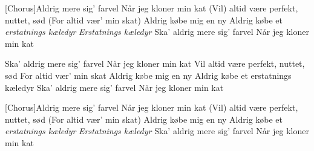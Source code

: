 \documentclass[a4paper,12pt]{article}
\begin{document}
\begin{song}

[Chorus]Aldrig mere sig' farvel
Når jeg kloner min kat
(Vil) altid være perfekt, nuttet, sød
(For altid vær' min skat)
Aldrig købe mig en ny
Aldrig købe et \emph{erstatnings kæledyr}
\emph{Erstatnings kæledyr}
Ska' aldrig mere sig' farvel
Når jeg kloner min kat

Ska' aldrig mere sig' farvel
Når jeg kloner min kat
Vil altid være perfekt, nuttet, sød
For altid vær' min skat
Aldrig købe mig en ny
Aldrig købe et erstatnings kæledyr
Ska' aldrig mere sig' farvel
Når jeg kloner min kat

[Chorus]Aldrig mere sig' farvel
Når jeg kloner min kat
(Vil) altid være perfekt, nuttet, sød
(For altid vær' min skat)
Aldrig købe mig en ny
Aldrig købe et \emph{erstatnings kæledyr}
\emph{Erstatnings kæledyr}
Ska' aldrig mere sig' farvel
Når jeg kloner min kat


\end{song}
\end{document}
